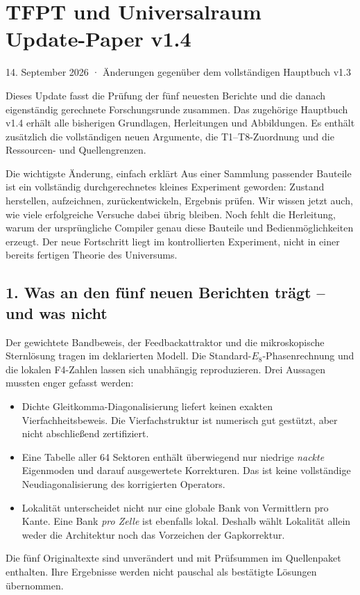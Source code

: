 \chapter*{TFPT und Universalraum\\Update-Paper v1.4}
\noindent\textsf{14. September 2026 · Änderungen gegenüber dem vollständigen Hauptbuch v1.3}

Dieses Update fasst die Prüfung der fünf neuesten Berichte und die danach eigenständig gerechnete Forschungsrunde zusammen. Das zugehörige Hauptbuch v1.4 erhält alle bisherigen Grundlagen, Herleitungen und Abbildungen. Es enthält zusätzlich die vollständigen neuen Argumente, die T1--T8-Zuordnung und die Ressourcen- und Quellengrenzen.

\begin{bild}{Die wichtigste Änderung, einfach erklärt}
Aus einer Sammlung passender Bauteile ist ein vollständig durchgerechnetes kleines Experiment geworden: Zustand herstellen, aufzeichnen, zurückentwickeln, Ergebnis prüfen. Wir wissen jetzt auch, wie viele erfolgreiche Versuche dabei übrig bleiben. Noch fehlt die Herleitung, warum der ursprüngliche Compiler genau diese Bauteile und Bedienmöglichkeiten erzeugt. Der neue Fortschritt liegt im kontrollierten Experiment, nicht in einer bereits fertigen Theorie des Universums.
\end{bild}

\section*{1. Was an den fünf neuen Berichten trägt -- und was nicht}
Der gewichtete Bandbeweis, der Feedbackattraktor und die mikroskopische Sternlösung tragen im deklarierten Modell. Die Standard-$E_8$-Phasenrechnung und die lokalen F4-Zahlen lassen sich unabhängig reproduzieren. Drei Aussagen mussten enger gefasst werden:
\begin{itemize}
\item Dichte Gleitkomma-Diagonalisierung liefert keinen exakten Vierfachheitsbeweis. Die Vierfachstruktur ist numerisch gut gestützt, aber nicht abschließend zertifiziert.
\item Eine Tabelle aller 64 Sektoren enthält überwiegend nur niedrige \emph{nackte} Eigenmoden und darauf ausgewertete Korrekturen. Das ist keine vollständige Neudiagonalisierung des korrigierten Operators.
\item Lokalität unterscheidet nicht nur eine globale Bank von Vermittlern pro Kante. Eine Bank \emph{pro Zelle} ist ebenfalls lokal. Deshalb wählt Lokalität allein weder die Architektur noch das Vorzeichen der Gapkorrektur.
\end{itemize}
Die fünf Originaltexte sind unverändert und mit Prüfsummen im Quellenpaket enthalten. Ihre Ergebnisse werden nicht pauschal als bestätigte Lösungen übernommen.

